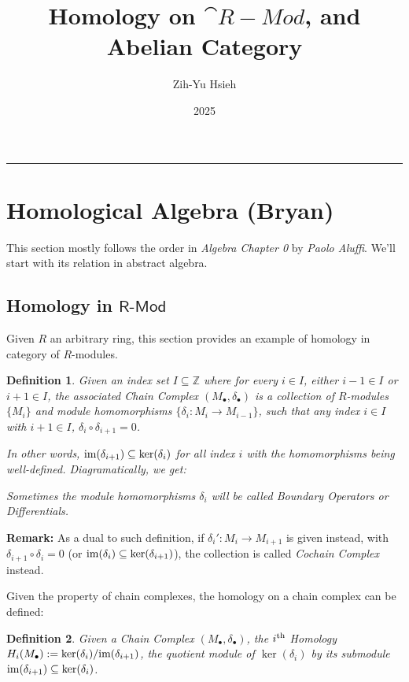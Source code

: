 \documentclass[x11names,reqno,12pt]{extarticle}
\title{Homology on $\cat{R-Mod}$, and Abelian Category}
\author{Zih-Yu Hsieh}
\date{2025}
\newtheorem{defn}{Definition}
\newcommand{\cat}[1]{\textsf{#1}}
\begin{document}
\maketitle
\hrule
\vspace{1em}
\renewcommand{\tilde}{\widetilde}
\section*{Homological Algebra (Bryan)}
This section mostly follows the order in \emph{Algebra Chapter 0} by \emph{Paolo Aluffi}. We'll start with its relation in abstract algebra.
\subsection*{Homology in $\cat{R-Mod}$}
Given $R$ an arbitrary ring, this section provides an example of homology in category of $R$-modules.

\begin{defn}
    Given an index set $I \subseteq \mathbb{Z}$ where for every $i\in I$, either $i-1\in I$ or $i+1\in I$, the associated \emph{Chain Complex} $(M_\bullet, \delta_\bullet)$ is a collection of $R$-modules $\{M_i\}$ and module homomorphisms $\{\delta_i:M_i\rightarrow M_{i-1}\}$, such that any index $i\in I$ with $i+1\in I$, $\delta_i\circ \delta_{i+1}=0$.

    In other words, $\textmd{im}(\delta_{i+1})\subseteq \ker(\delta_i)$ for all index $i$ with the homomorphisms being well-defined. Diagramatically, we get:
    \begin{center}
    \end{center}
    Sometimes the module homomorphisms $\delta_i$ will be called \textmd{Boundary Operators} or \textmd{Differentials}.
\end{defn}
\textbf{Remark:} As a dual to such definition, if $\delta_i':M_i\rightarrow M_{i+1}$ is given instead, with $\delta_{i+1}\circ \delta_i=0$ (or $\textmd{im}(\delta_{i})\subseteq \ker(\delta_{i+1})$), the collection is called \emph{Cochain Complex} instead.

\hfill

Given the property of chain complexes, the homology on a chain complex can be defined:
\begin{defn}
    Given a Chain Complex $(M_\bullet, \delta_\bullet)$, the \emph{$i^\textmd{th}$ Homology} $H_i(M_\bullet) := \ker(\delta_i)/\textmd{im}(\delta_{i+1})$, the quotient module of $\ker(\delta_i)$ by its submodule $\textmd{im}(\delta_{i+1})\subseteq \ker(\delta_i)$.
\end{defn}
\end{document}
